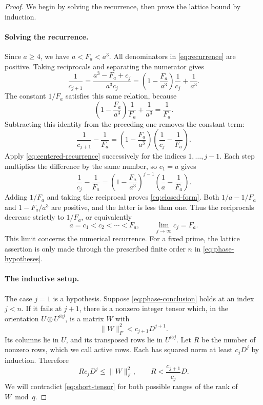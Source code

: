 \documentclass[11pt,letterpaper]{article}
\numberwithin{equation}{section}
\theoremstyle{definition}
\theoremstyle{remark}
\begin{document}
\begin{proof}
We begin by solving the recurrence, then prove the lattice bound by induction.

\paragraph{Solving the recurrence.}
Since $a\ge4$, we have $a<F_a<a^3$. All denominators in \eqref{eq:recurrence} are positive. Taking reciprocals and separating the numerator gives
\[
 \frac1{c_{j+1}}
 =\frac{a^3-F_a+c_j}{a^3c_j}
 =\left(1-\frac{F_a}{a^3}\right)\frac1{c_j}
   +\frac1{a^3}.
\]
The constant $1/F_a$ satisfies this same relation, because
\[
 \left(1-\frac{F_a}{a^3}\right)\frac1{F_a}
 +\frac1{a^3}=\frac1{F_a}.
\]
Subtracting this identity from the preceding one removes the constant term:
\begin{equation}\label{eq:centered-recurrence}
 \frac1{c_{j+1}}-\frac1{F_a}
 =\left(1-\frac{F_a}{a^3}\right)
   \left(\frac1{c_j}-\frac1{F_a}\right).
\end{equation}
Apply \eqref{eq:centered-recurrence} successively for the indices $1,\ldots,j-1$. Each step multiplies the difference by the same number, so $c_1=a$ gives
\begin{equation}\label{eq:reciprocal-formula}
 \frac1{c_j}-\frac1{F_a}
 =\left(1-\frac{F_a}{a^3}\right)^{j-1}
   \left(\frac1a-\frac1{F_a}\right).
\end{equation}
Adding $1/F_a$ and taking the reciprocal proves \eqref{eq:closed-form}. Both $1/a-1/F_a$ and $1-F_a/a^3$ are positive, and the latter is less than one. Thus the reciprocals decrease strictly to $1/F_a$, or equivalently
\begin{equation}\label{eq:coefficient-properties}
 a=c_1<c_2<\cdots<F_a,\qquad \lim_{j\to\infty}c_j=F_a.
\end{equation}
This limit concerns the numerical recurrence. For a fixed prime, the lattice assertion is only made through the prescribed finite order $n$ in \eqref{eq:phase-hypotheses}.

\paragraph{The inductive setup.}
The case $j=1$ is a hypothesis. Suppose \eqref{eq:phase-conclusion} holds at an index $j<n$. If it fails at $j+1$, there is a nonzero integer tensor which, in the orientation $U\otimes U^{\otimes j}$, is a matrix $W$ with
\begin{equation}\label{eq:short-tensor}
 \|W\|_F^2<c_{j+1}D^{j+1}.
\end{equation}
Its columns lie in $U$, and its transposed rows lie in $U^{\otimes j}$. Let $R$ be the number of nonzero rows, which we call active rows. Each has squared norm at least $c_jD^j$ by induction. Therefore
\begin{equation}\label{eq:active-rows}
 Rc_jD^j\le\|W\|_F^2,
 \qquad R<\frac{c_{j+1}}{c_j}D.
\end{equation}
We will contradict \eqref{eq:short-tensor} for both possible ranges of the rank of $W\bmod q$.


\end{proof}
\end{document}
